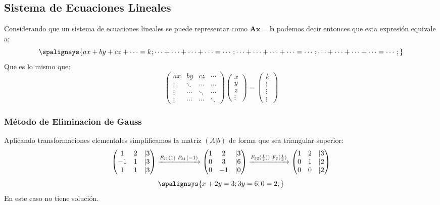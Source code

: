 \subsection{Sistema de Ecuaciones Lineales}
Considerando que un sistema de ecuaciones lineales se puede representar como \(\mathbf{Ax = b}\) podemos decir entonces que esta expresión equivale a:
\[
        \spalignsys{
                ax +  by + cz + \cdots = k ;
                \cdots + \cdots +  \cdots +  \cdots = \cdots ;
                \cdots + \cdots +  \cdots +  \cdots =  \cdots ;
                \cdots + \cdots +  \cdots +  \cdots = \cdots ;
        }
\]
Que es lo mismo que:
\[
        \begin{pmatrix}
                ax     & by     & cz     & \cdots \\
                \vdots & \ddots & \cdots & \cdots \\
                \vdots & \cdots & \ddots & \cdots \\
                \vdots & \cdots & \cdots & \ddots
        \end{pmatrix}
        \begin{pmatrix}
                x \\
                y \\
                z \\
                \vdots
        \end{pmatrix}
        =
        \begin{pmatrix}
                k      \\
                \vdots \\
                \vdots \\
                \vdots
        \end{pmatrix}
\]
\subsubsection{Método de Eliminacion de Gauss}
Aplicando transformaciones elementales simplificamos la matriz \((A|b)\) de forma que sea triangular superior:
\[
        \begin{pmatrix}
                1  & 2 & |3 \\
                -1 & 1 & |3 \\
                1  & 1 & |3
        \end{pmatrix}
        \xrightarrow[]{F_{21}(1) \hspace{1mm} F_{31}(-1)}
        \begin{pmatrix}
                1 & 2  & |3 \\
                0 & 3  & |6 \\
                0 & -1 & |0
        \end{pmatrix}
        \xrightarrow[]{F_{32}(\frac{1}{3})) \hspace{1mm} F_2(\frac{1}{3})}
        \begin{pmatrix}
                1 & 2 & |3 \\
                0 & 1 & |2 \\
                0 & 0 & |2
        \end{pmatrix}
\]
\[
        \spalignsys{
                x +  2y = 3 ;
                3y = 6 ;
                0 = 2 ;
        }
\]
En este caso no tiene solución.
